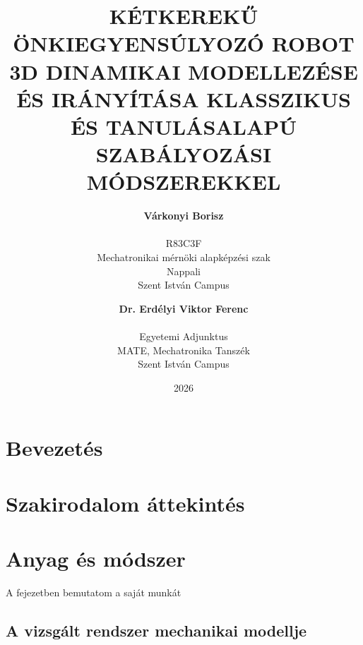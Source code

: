 \documentclass[openany]{book}
\begin{document}
	
	\title{KÉTKEREKŰ ÖNKIEGYENSÚLYOZÓ ROBOT 3D DINAMIKAI MODELLEZÉSE ÉS IRÁNYÍTÁSA KLASSZIKUS ÉS TANULÁSALAPÚ SZABÁLYOZÁSI MÓDSZEREKKEL}
	
	\author{
		\textbf{Várkonyi Borisz}\\\\
		R83C3F \\
		Mechatronikai mérnöki alapképzési szak \\
		Nappali \\
		Szent István Campus
		\and
		\textbf{Dr. Erdélyi Viktor Ferenc}\\\\
		Egyetemi Adjunktus \\
		MATE, Mechatronika Tanszék\\
		Szent István Campus
	}
	\date{2026}
	
	\maketitle
	
	\chapter{Bevezetés}
	
	\chapter{Szakirodalom áttekintés}

	\chapter{Anyag és módszer}
	
	A fejezetben bemutatom a saját munkát
	
	\section{A vizsgált rendszer mechanikai modellje}

	
\end{document}
